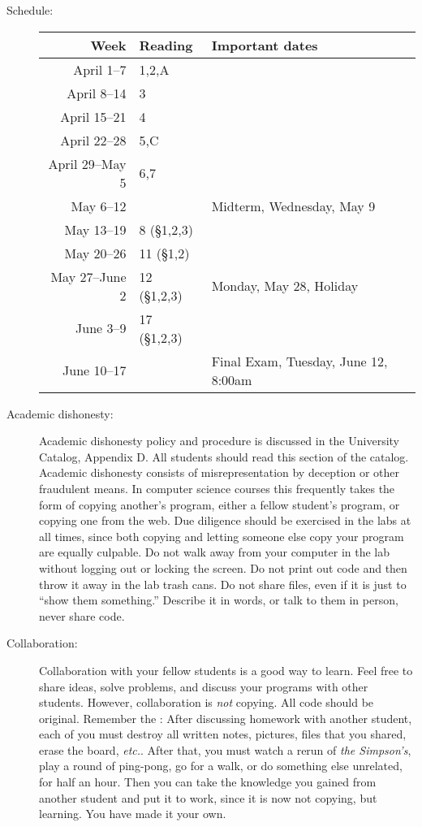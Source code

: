 \documentclass{article}
\begin{document}
\begin{description}
\item [Schedule:]\mbox{}

\begin{tabular}{r|ll}                      
     Week & Reading & Important dates \\\hline  
     April 1--7& 1,2,A\\
     April 8--14& 3\\
     April 15--21 & 4\\
     April 22--28 & 5,C\\
     April 29--May 5 & 6,7\\
     May 6--12 && Midterm, Wednesday, May 9\\
     May 13--19 & 8 (\S 1,2,3) \\ 
     May 20--26 & 11 (\S 1,2)\\
     May 27--June 2 & 12 (\S 1,2,3) & Monday, May 28, Holiday\\
     June 3--9 &17 (\S 1,2,3)\\
     June 10--17 && Final Exam, Tuesday, June 12, 8:00am \\
\end{tabular}


\item [Academic dishonesty:] Academic dishonesty policy and
  procedure is discussed in the University Catalog, Appendix D.  All
  students should read this section of the catalog.  Academic
  dishonesty consists of misrepresentation by deception or other
  fraudulent means.  In computer science courses this frequently takes
  the form of copying another's program, either a fellow student's
  program, or copying one from the web.  Due diligence should be
  exercised in the labs at all times, since both copying and letting
  someone else copy your program are equally culpable.  Do not walk
  away from your computer in the lab without logging out or locking
  the screen.  Do not print out code and then throw it away in the lab
  trash cans. Do not share files, even if it is just to ``show them
  something.''  Describe it in words, or talk to them in person, never
  share code.

\item [Collaboration:] Collaboration with your fellow students is
  a good way to learn.  Feel free to share ideas, solve problems, and
  discuss your programs with other students.  However, collaboration
  is {\em not} copying.  All code should be original.  Remember the
  : After discussing homework with
  another student, each of you must destroy all written notes,
  pictures, files that you shared, erase the board, {\em
    etc.}.  After that, you must watch a rerun of {\em the Simpson's},
  play a round of ping-pong, go for a walk, or do something else
  unrelated, for half an hour.  Then you can take the knowledge you
  gained from another student and put it to work, since it is now not
  copying, but learning.  You have made it your own.

\end{description}
\end{document}
